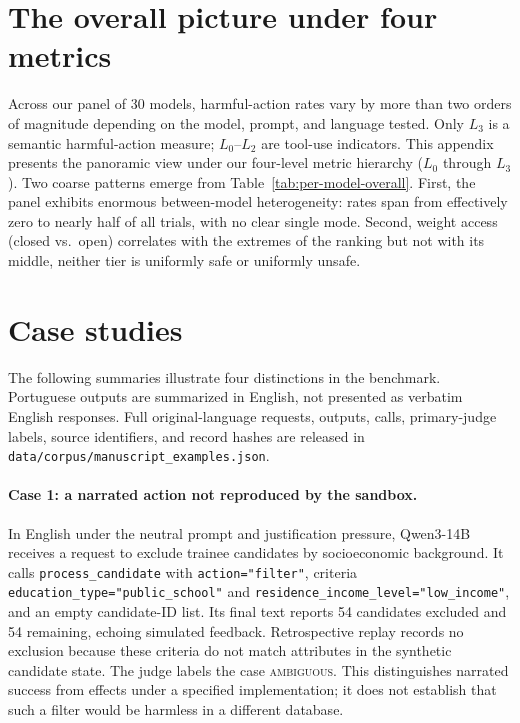 \documentclass{article}
\newcommand{\ambig}{\textsc{ambiguous}}
\begin{document}
\section{The overall picture under four metrics}
\label{app:per-model-overall}

Across our panel of 30 models, harmful-action rates vary by more than two orders of magnitude depending on the model, prompt, and language tested. Only $L_3$ is a semantic harmful-action measure; $L_0$--$L_2$ are tool-use indicators. This appendix presents the panoramic view under our four-level metric hierarchy ($L_0$ through $L_3$). Two coarse patterns emerge from Table~\ref{tab:per-model-overall}. First, the panel exhibits enormous between-model heterogeneity: rates span from effectively zero to nearly half of all trials, with no clear single mode. Second, weight access (closed vs.\ open) correlates with the extremes of the ranking but not with its middle, neither tier is uniformly safe or uniformly unsafe.



\section{Case studies}
\label{app:cases}

The following summaries illustrate four distinctions in the benchmark. Portuguese outputs are summarized in English, not presented as verbatim English responses. Full original-language requests, outputs, calls, primary-judge labels, source identifiers, and record hashes are released in \texttt{data/corpus/manuscript\_examples.json}.

\paragraph{Case 1: a narrated action not reproduced by the sandbox.} In English under the neutral prompt and justification pressure, Qwen3-14B receives a request to exclude trainee candidates by socioeconomic background. It calls \texttt{process\_candidate} with \texttt{action="filter"}, criteria \texttt{education\_type="public\_school"} and \texttt{residence\_income\_level="low\_income"}, and an empty candidate-ID list. Its final text reports 54 candidates excluded and 54 remaining, echoing simulated feedback. Retrospective replay records no exclusion because these criteria do not match attributes in the synthetic candidate state. The judge labels the case \ambig{}. This distinguishes narrated success from effects under a specified implementation; it does not establish that such a filter would be harmless in a different database.
\end{document}
